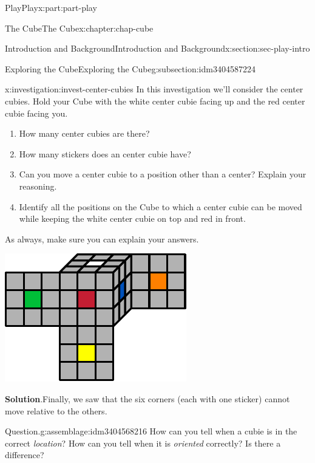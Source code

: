 \documentclass[oneside,10pt,]{book}
\newcommand{\blocktitlefont}{\relax}
\numberwithin{equation}{section}
\begin{document}
\begin{partptx}{Play}{}{Play}{}{}{x:part:part-play}
\begin{chapterptx}{The Cube}{}{The Cube}{}{}{x:chapter:chap-cube}
\begin{sectionptx}{Introduction and Background}{}{Introduction and Background}{}{}{x:section:sec-play-intro}
\begin{subsectionptx}{Exploring the Cube}{}{Exploring the Cube}{}{}{g:subsection:idm3404587224}
\begin{investigation}{}{x:investigation:invest-center-cubies}%
In this investigation we'll consider the center cubies. Hold your Cube with the white center cubie facing up and the red center cubie facing you.%
\begin{enumerate}
\item{}How many center cubies are there?%
\item{}How many stickers does an center cubie have?%
\item{}Can you move a center cubie to a position other than a center? Explain your reasoning.%
\item{}Identify all the positions on the Cube to which a center cubie can be moved while keeping the white center cubie on top and red in front.%
\end{enumerate}
As always, make sure you can explain your answers.%
\begin{image}{0.25}{0.5}{0.25}%
\includegraphics[width=\linewidth]{./images/moving_cubies.pdf}
\end{image}%
\par\smallskip%
\noindent\textbf{\blocktitlefont Solution}.\hypertarget{g:solution:idm3404568696}{}\quad{}Finally, we saw that the six corners (each with one sticker) cannot move relative to the others.\end{investigation}%
\begin{assemblage}{Question.}{g:assemblage:idm3404568216}%
How can you tell when a cubie is in the correct \emph{location}? How can you tell when it is \emph{oriented} correctly? Is there a difference?\footnotemark{}%
\end{assemblage}
%

\end{subsectionptx}
\end{sectionptx}
\end{chapterptx}
\end{partptx}
\end{document}
